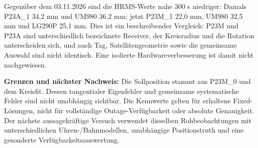 \documentclass[11pt,a4paper]{article}
\numberwithin{equation}{section}
\numberwithin{figure}{section}
\begin{document}
Gegenüber dem 03.11.2026 sind die HRMS-Werte nahe 300 s niedriger: Damals P23A\_1 34,2 mm und UM980 36,2 mm; jetzt P23M\_1 22,0 mm, UM980 32,5 mm und LG290P 25,1 mm. Dies ist ein beschreibender Vergleich: P23M und P23A sind unterschiedlich bezeichnete Receiver, der Kreisradius und die Rotation unterscheiden sich, und auch Tag, Satellitengeometrie sowie die gemeinsame Auswahl sind nicht identisch. Eine isolierte Hardwareverbesserung ist damit nicht nachgewiesen.

\textbf{Grenzen und nächster Nachweis:} Die Sollposition stammt aus P23M\_0 und dem Kreisfit. Dessen tangentialer Eigenfehler und gemeinsame systematische Fehler sind nicht unabhängig sichtbar. Die Kennwerte gelten für erhaltene Fixed-Lösungen, nicht für vollständige Outage-Verfügbarkeit oder absolute Genauigkeit. Der nächste aussagekräftige Versuch verwendet dieselben Rohbeobachtungen mit unterschiedlichen Uhren-/\allowbreak{}Bahnmodellen, unabhängige Positionstruth und eine gesonderte Verfügbarkeitsauswertung.
\end{document}
